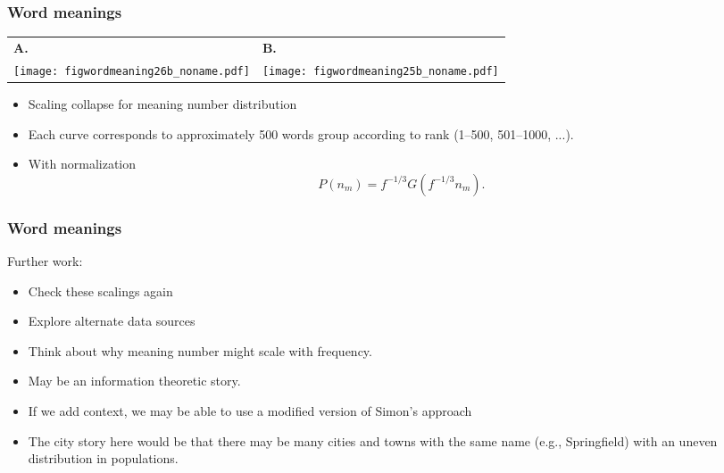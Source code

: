 \begin{frame}
  \frametitle{Word meanings}

  \begin{block}{}
    \begin{tabular}{ll}
      \textbf{A.} & 
      \textbf{B.} \\
      \texttt{[image: figwordmeaning26b\_noname.pdf]} & 
      \texttt{[image: figwordmeaning25b\_noname.pdf]} \\
    \end{tabular}

    \begin{itemize}
    \item 
      Scaling collapse for meaning number distribution
    \item 
      Each curve corresponds to approximately 500 words
      group according to rank (1--500, 501--1000, ...).
    \item  
      With normalization
      $$
      P(n_m) = f^{-1/3}
      G \left( f^{-1/3} n_m \right).
      $$
    \end{itemize}
  \end{block}

\end{frame}


\begin{frame}
  \frametitle{Word meanings}

  \begin{block}{Further work:}
    \begin{itemize}
    \item<1-> Check these scalings again
    \item<2-> Explore alternate data sources
    \item<3-> Think about
      why meaning number might scale with frequency.
    \item<4-> May be an information theoretic story.
    \item<5-> If we add context, we may be able to
      use a modified version of Simon's approach\cite{simon1955a}
    \item<6->
      The city story here would be that there may
      be many cities and towns with the same
      name (e.g., Springfield) with an uneven distribution in populations.
    \end{itemize}
  \end{block}

\end{frame}



